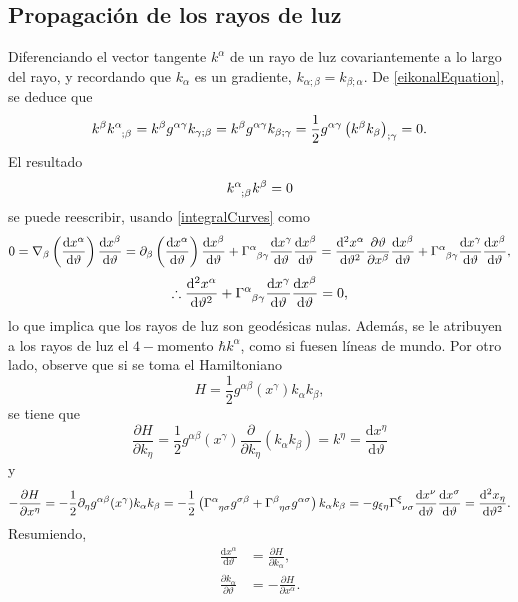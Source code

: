 \subsection{Propagación de los rayos de luz}
Diferenciando el vector tangente $k^\alpha$ de un rayo de luz covariantemente a lo largo del rayo, y recordando que $k_\alpha$ es un gradiente, $k_{\alpha;\beta}=k_{\beta;\alpha}$. De \eqref{eikonalEquation}, se deduce que
$$k^\beta k\indices{^\alpha_{;\beta}}=k^\beta g^{\alpha\gamma}k_{\gamma;\beta}=k^\beta g^{\alpha\gamma}k_{\beta;\gamma}=\frac{1}{2}g^{\alpha\gamma}\left( k^\beta k_\beta \right)_{;\gamma}=0.$$
El resultado
\begin{equation}
	k\indices{^\alpha_{;\beta}}k^\beta =0
\end{equation}
se puede reescribir, usando \eqref{integralCurves} como
\begin{dmath*}
0=\nabla_\beta \left( \frac{\mathrm{d}x^\alpha}{\mathrm{d}\vartheta}\right)\frac{\mathrm{d}x^\beta}{\mathrm{d}\vartheta}=\partial_\beta \left( \frac{\mathrm{d}x^\alpha}{\mathrm{d}\vartheta}\right)\frac{\mathrm{d}x^\beta}{\mathrm{d}\vartheta} + \Gamma\indices{^\alpha_{\beta\gamma}} \frac{\mathrm{d}x^\gamma}{\mathrm{d}\vartheta}\frac{\mathrm{d}x^\beta}{\mathrm{d}\vartheta}=\frac{\mathrm{d}^2 x^\alpha}{\mathrm{d}\vartheta^2}\frac{\partial \vartheta}{\partial x^\beta}\frac{\mathrm{d}x^\beta}{\mathrm{d}\vartheta}+\Gamma\indices{^\alpha_{\beta\gamma}} \frac{\mathrm{d}x^\gamma}{\mathrm{d}\vartheta}\frac{\mathrm{d}x^\beta}{\mathrm{d}\vartheta},
\end{dmath*}
\begin{equation}\label{geodesicLight}
\therefore  \frac{\mathrm{d}^2 x^\alpha}{\mathrm{d}\vartheta^2}+\Gamma\indices{^\alpha_{\beta\gamma}} \frac{\mathrm{d}x^\gamma}{\mathrm{d}\vartheta}\frac{\mathrm{d}x^\beta}{\mathrm{d}\vartheta}=0,
\end{equation}
lo que implica que los rayos de luz son geodésicas nulas. Además, se le atribuyen a los rayos de luz el $4-$momento $\hbar k^\alpha$, como si fuesen líneas de mundo. Por otro lado, observe que si se toma el Hamiltoniano
\begin{equation}\label{hamiltonianLight}
	H=\frac{1}{2}g^{\alpha\beta}(x^\gamma)k_\alpha k_\beta,
\end{equation}
se tiene que
$$\frac{\partial H}{\partial k_\eta}=\frac{1}{2}g^{\alpha\beta}(x^\gamma)\frac{\partial}{\partial k_\eta} \left( k_\alpha k_\beta \right)=k^\eta=\frac{\mathrm{d}x^\eta}{\mathrm{d}\vartheta}$$
y
$$-\frac{\partial H}{\partial x^\eta}=-\frac{1}{2}\partial_\eta g^{\alpha\beta}(x^\gamma)k_\alpha k_\beta=-\frac{1}{2}\left( \Gamma\indices{^\alpha_{\eta\sigma}}g^{\sigma\beta}+\Gamma\indices{^\beta_{\eta\sigma}}g^{\alpha\sigma} \right)k_\alpha k_\beta=-g_{\xi\eta}\Gamma\indices{^\xi_{\nu\sigma}}\frac{\mathrm{d}x^\nu}{\mathrm{d}\vartheta}\frac{\mathrm{d}x^\sigma}{\mathrm{d}\vartheta}=\frac{\mathrm{d}^2 x_\eta}{\mathrm{d}\vartheta^2}.$$
Resumiendo,
\begin{align}
\label{hamiltonLight1}
\frac{\mathrm{d}x^\alpha}{\mathrm{d}\vartheta} &=  \frac{\partial H}{\partial k_\alpha},\\
\label{hamiltonLight2}
\frac{\partial k_\alpha}{\partial\vartheta} &=  -\frac{\partial H}{\partial x^\alpha}.
\end{align}
